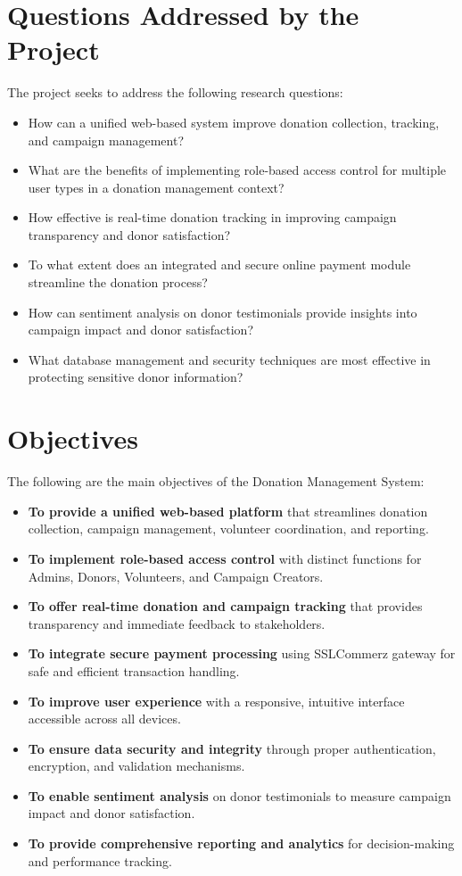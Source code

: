 \section{Questions Addressed by the Project}

The project seeks to address the following research questions:
\begin{itemize}
    \item How can a unified web-based system improve donation collection, tracking, and campaign management?
    \item What are the benefits of implementing role-based access control for multiple user types in a donation management context?
    \item How effective is real-time donation tracking in improving campaign transparency and donor satisfaction?
    \item To what extent does an integrated and secure online payment module streamline the donation process?
    \item How can sentiment analysis on donor testimonials provide insights into campaign impact and donor satisfaction?
    \item What database management and security techniques are most effective in protecting sensitive donor information?
\end{itemize}

\newpage
\section{Objectives}
The following are the main objectives of the Donation Management System:
\begin{itemize}
    \item \textbf{To provide a unified web-based platform} that streamlines donation collection, campaign management, volunteer coordination, and reporting.
    \item \textbf{To implement role-based access control} with distinct functions for Admins, Donors, Volunteers, and Campaign Creators.
    \item \textbf{To offer real-time donation and campaign tracking} that provides transparency and immediate feedback to stakeholders.
    \item \textbf{To integrate secure payment processing} using SSLCommerz gateway for safe and efficient transaction handling.
    \item \textbf{To improve user experience} with a responsive, intuitive interface accessible across all devices.
    \item \textbf{To ensure data security and integrity} through proper authentication, encryption, and validation mechanisms.
    \item \textbf{To enable sentiment analysis} on donor testimonials to measure campaign impact and donor satisfaction.
    \item \textbf{To provide comprehensive reporting and analytics} for decision-making and performance tracking.
\end{itemize}

